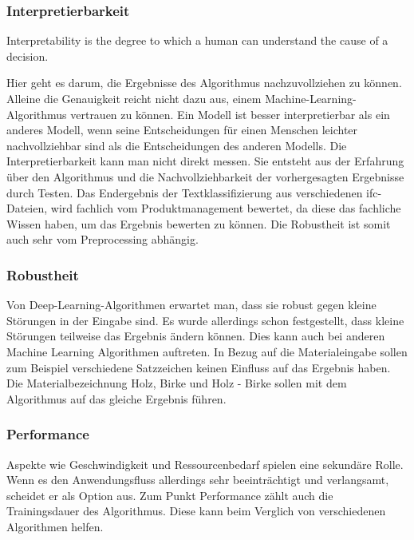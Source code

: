 \subsubsection{Interpretierbarkeit}
\begin{definition}[Interpretierbarkeit]
	\label{def:interpretability}
	\glqq Interpretability is the degree to which a human can understand the cause of a decision.\grqq{}\citep{miller_2017}
\end{definition}
Hier geht es darum, die Ergebnisse des Algorithmus nachzuvollziehen zu können. Alleine die Genauigkeit reicht nicht dazu aus, einem Machine-Learning-Algorithmus vertrauen zu können.
Ein Modell ist besser interpretierbar als ein anderes Modell, wenn seine Entscheidungen für einen Menschen leichter nachvollziehbar sind als die Entscheidungen des anderen Modells. Die Interpretierbarkeit kann man nicht direkt messen. Sie entsteht aus der Erfahrung über den Algorithmus und die Nachvollziehbarkeit der vorhergesagten Ergebnisse durch Testen.  \citep[vgl.][]{molnar2022} Das Endergebnis der Textklassifizierung aus verschiedenen \ac{ifc}-Dateien, wird fachlich vom Produktmanagement bewertet, da diese das fachliche Wissen haben, um das Ergebnis bewerten zu können. Die Robustheit ist somit auch sehr vom Preprocessing abhängig.

\subsubsection{Robustheit}

Von Deep-Learning-Algorithmen erwartet man, dass sie robust gegen kleine Störungen in der Eingabe sind. Es wurde allerdings schon festgestellt, dass kleine Störungen teilweise das Ergebnis ändern können. \citep[vgl.][]{Szegedy_2013} Dies kann auch bei anderen Machine Learning Algorithmen auftreten. In Bezug auf die Materialeingabe sollen zum Beispiel verschiedene Satzzeichen keinen Einfluss auf das Ergebnis haben. Die Materialbezeichnung \glqq Holz, Birke\grqq{} und \glqq Holz - Birke\grqq{} sollen mit dem Algorithmus auf das gleiche Ergebnis führen.

\subsubsection{Performance}

Aspekte wie Geschwindigkeit und Ressourcenbedarf spielen eine sekundäre Rolle. Wenn es den Anwendungsfluss allerdings sehr beeinträchtigt und verlangsamt, scheidet er als Option aus. Zum Punkt Performance zählt auch die Trainingsdauer des Algorithmus. Diese kann beim Verglich von verschiedenen Algorithmen helfen.\\

